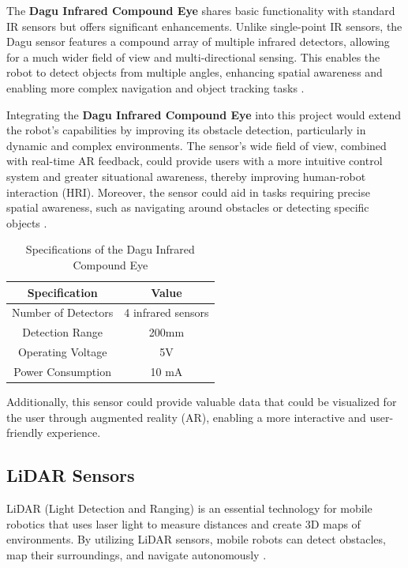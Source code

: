 The \textbf{Dagu Infrared Compound Eye} shares basic functionality with standard IR sensors but offers significant enhancements. Unlike single-point IR sensors, the Dagu sensor features a compound array of multiple infrared detectors, allowing for a much wider field of view and multi-directional sensing. This enables the robot to detect objects from multiple angles, enhancing spatial awareness and enabling more complex navigation and object tracking tasks \cite{rhydo2024}.

Integrating the \textbf{Dagu Infrared Compound Eye} into this project would extend the robot's capabilities by improving its obstacle detection, particularly in dynamic and complex environments. The sensor’s wide field of view, combined with real-time AR feedback, could provide users with a more intuitive control system and greater situational awareness, thereby improving human-robot interaction (HRI). Moreover, the sensor could aid in tasks requiring precise spatial awareness, such as navigating around obstacles or detecting specific objects \cite{benet2002infrared}.

\begin{table}[ht]
\centering
\caption{Specifications of the Dagu Infrared Compound Eye}
\begin{tabular}{|c|c|}
\hline
\textbf{Specification} & \textbf{Value} \\ \hline
Number of Detectors & 4 infrared sensors \\ \hline
Detection Range & 200mm \\ \hline
Operating Voltage & 5V \\ \hline
Power Consumption & 10 mA \\ \hline
\end{tabular}
\label{tab:dagu_infrared}
\end{table}


Additionally, this sensor could provide valuable data that could be visualized for the user through augmented reality (AR), enabling a more interactive and user-friendly experience.

\subsection{LiDAR Sensors} LiDAR (Light Detection and Ranging) is an essential technology for mobile robotics that uses laser light to measure distances and create 3D maps of environments. By utilizing LiDAR sensors, mobile robots can detect obstacles, map their surroundings, and navigate autonomously \cite{yang2022lidar}.

